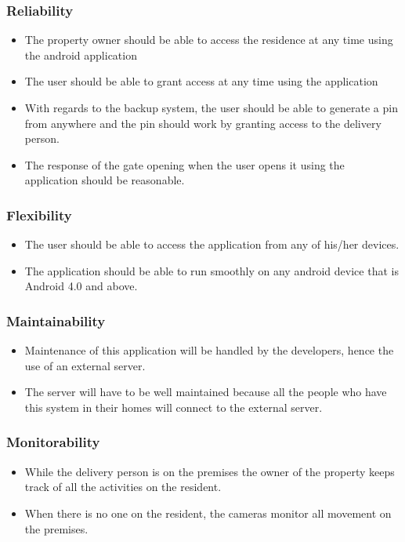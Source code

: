 \documentclass[a4paper,12pt]{article}
\begin{document}
	\subsubsection{Reliability}
	\begin{itemize}
		\item The property owner should be able to access the residence at any time using the android application 
		\item The user should be able to grant access at any time using the application
		\item With regards to the backup system, the user should be able to generate a pin from anywhere and the pin should work by granting access to the delivery person. 
		\item The response of the gate opening when the user opens it using the application should be reasonable.
	\end{itemize}
	
	\subsubsection{Flexibility}
	\begin{itemize}
		\item The user should be able to access the application from any of his/her devices.
		\item The application should be able to run smoothly on any android device that is Android 4.0 and above.
	\end{itemize}
	
	\subsubsection{Maintainability}
	\begin{itemize}
		\item Maintenance of this application will be handled by the developers, hence the use of an external server.
		\item The server will have to be well maintained because all the people who have this system in their homes will connect to the external server. 
	\end{itemize}
	
	\subsubsection{Monitorability}
	\begin{itemize}
		\item While the delivery person is on the premises the owner of the property keeps track of all the activities on the resident. 
		\item When there is no one on the resident, the cameras monitor all movement on the premises.  
	\end{itemize}
	
\end{document}
